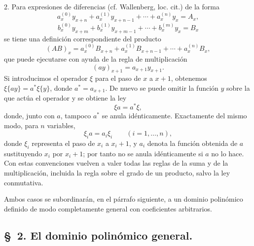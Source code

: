 \documentclass[11pt]{article}
\begin{document}
2. Para expresiones de diferencias (cf. Wallenberg, loc. cit.) de la forma
\[
 a_x^{(0)}y_{x+n}+a_x^{(1)}y_{x+n-1}+\cdots+a_x^{(n)}y_x=A_x,
\]
\[
 b_x^{(0)}y_{x+m}+b_x^{(1)}y_{x+m-1}+\cdots+b_x^{(m)}y_x=B_x
\]
se tiene una definición correspondiente del producto
\[
 (AB)_x=a_x^{(0)}B_{x+n}+a_x^{(1)}B_{x+n-1}+\cdots+a_x^{(n)}B_x,
\]
que puede ejecutarse con ayuda de la regla de multiplicación
\[
 (ay)_{x+1}=a_{x+1}y_{x+1}.
\]
Si introducimos el operador $\xi$ para el paso de $x$ a $x+1$, obtenemos $\xi\{ay\}=a^*\xi\{y\}$, donde $a^*=a_{x+1}$. De nuevo se puede omitir la función $y$ sobre la que actúa el operador y se obtiene la ley
\begin{equation}
 \xi a=a^*\xi,
\tag{3}
\end{equation}
donde, junto con $a$, tampoco $a^*$ se anula idénticamente. Exactamente del mismo modo, para $n$ variables,
\begin{equation}
 \xi_i a=a_i\xi_i\qquad (i=1,\ldots,n),
\tag{4}
\end{equation}
donde $\xi_i$ representa el paso de $x_i$ a $x_i+1$, y $a_i$ denota la función obtenida de $a$ sustituyendo $x_i$ por $x_i+1$; por tanto no se anula idénticamente si $a$ no lo hace. Con estas convenciones vuelven a valer todas las reglas de la suma y de la multiplicación, incluida la regla sobre el grado de un producto, salvo la ley conmutativa.

Ambos casos se subordinarán, en el párrafo siguiente, a un dominio polinómico definido de modo completamente general con coeficientes arbitrarios.

\subsection*{\S~2. El dominio polinómico general.}
\end{document}
